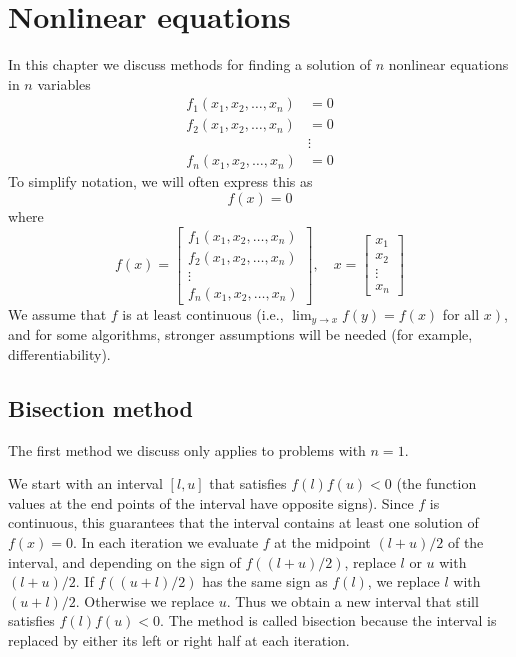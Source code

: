 \chapter{Nonlinear equations}

In this chapter we discuss methods for finding a solution of $ n $ nonlinear equations in $ n $ variables
$$
\begin{aligned}
f_{1}\left(x_{1}, x_{2}, \ldots, x_{n}\right) &=0 \\
f_{2}\left(x_{1}, x_{2}, \ldots, x_{n}\right) &=0 \\
& \vdots \\
f_{n}\left(x_{1}, x_{2}, \ldots, x_{n}\right) &=0
\end{aligned}
$$
To simplify notation, we will often express this as
$$
f(x)=0
$$
where
$$
f(x)=\left[\begin{array}{c}
f_{1}\left(x_{1}, x_{2}, \ldots, x_{n}\right) \\
f_{2}\left(x_{1}, x_{2}, \ldots, x_{n}\right) \\
\vdots \\
f_{n}\left(x_{1}, x_{2}, \ldots, x_{n}\right)
\end{array}\right], \quad x=\left[\begin{array}{c}
x_{1} \\
x_{2} \\
\vdots \\
x_{n}
\end{array}\right]
$$
We assume that $ f $ is at least continuous (i.e., $ \lim _{y \rightarrow x} f(y)=f(x) $ for all $ \left.x\right) $, and for some algorithms, stronger assumptions will be needed (for example, differentiability).

\section{Bisection method}

The first method we discuss only applies to problems with $ n=1 $.

We start with an interval $ [l, u] $ that satisfies $ f(l) f(u)<0 $ (the function values at the end points of the interval have opposite signs). Since $ f $ is continuous, this guarantees that the interval contains at least one solution of $ f(x)=0 $. In each iteration we evaluate $ f $ at the midpoint $ (l+u) / 2 $ of the interval, and depending on the sign of $ f((l+u) / 2) $, replace $ l $ or $ u $ with $ (l+u) / 2 $. If $ f((u+l) / 2) $ has the same sign as $ f(l) $, we replace $ l $ with $ (u+l) / 2 $. Otherwise we replace $ u $. Thus we obtain a new interval that still satisfies $ f(l) f(u)<0 $. The method is called bisection because the interval is replaced by either its left or right half at each iteration.

